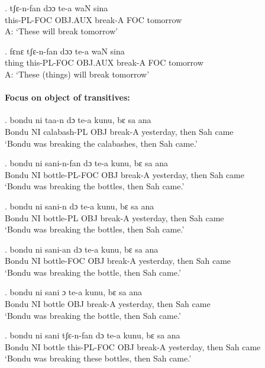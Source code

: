 \documentclass{assets/fieldnotes}
\begin{document}
\exg.
tʃɛ-n-fan     dɔɔ       te-a      waN   sina     \\
this-PL-FOC   OBJ.AUX   break-A   FOC   tomorrow \\%
A: `These will break tomorrow'

\exg.
fɛnɛ    tʃɛ-n-fan     dɔɔ       te-a      waN   sina     \\
thing   this-PL-FOC   OBJ.AUX   break-A   FOC   tomorrow \\%
A: `These (things) will break tomorrow'


\paragraph*{Focus on object of transitives:}


\exg.
bondu   ni   taa-n         dɔ    te-a      kunu,        bɛ     sa    ana  \\
Bondu   NI   calabash-PL   OBJ   break-A   yesterday,   then   Sah   came \\%
`Bondu was breaking the calabashes, then Sah came.'

\exg.
bondu   ni   sani-n-fan      dɔ    te-a      kunu,        bɛ     sa    ana  \\
Bondu   NI   bottle-PL-FOC   OBJ   break-A   yesterday,   then   Sah   came \\%
`Bondu was breaking the bottles, then Sah came.'

\exg.
bondu   ni   sani-n      dɔ    te-a      kunu,        bɛ     sa    ana  \\
Bondu   NI   bottle-PL   OBJ   break-A   yesterday,   then   Sah   came \\%
`Bondu was breaking the bottles, then Sah came.'

\exg.
bondu   ni   sani-an      dɔ    te-a      kunu,        bɛ     sa    ana  \\
Bondu   NI   bottle-FOC   OBJ   break-A   yesterday,   then   Sah   came \\%
`Bondu was breaking the bottle, then Sah came.'

\exg.
bondu   ni   sani     ɔ     te-a      kunu,        bɛ     sa    ana  \\
Bondu   NI   bottle   OBJ   break-A   yesterday,   then   Sah   came \\%
`Bondu was breaking the bottle, then Sah came.'

\exg.
bondu   ni   sani     tʃɛ-n-fan     dɔ    te-a      kunu,        bɛ     sa    ana  \\
Bondu   NI   bottle   this-PL-FOC   OBJ   break-A   yesterday,   then   Sah   came \\%
`Bondu was breaking these bottles, then Sah came.'
\end{document}
